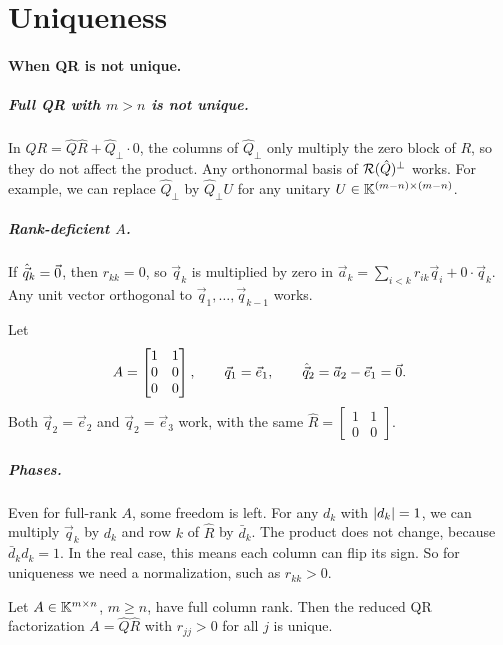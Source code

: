 \section{Uniqueness}

\paragraph{When QR is not unique.}
\subparagraph{Full QR with $m > n$ is not unique.} In $QR = \hat{Q}\hat{R} + \hat{Q}_\perp \cdot 0$, the columns of $\hat{Q}_\perp$ only multiply the zero block of $R$, so they do not affect the product. Any orthonormal basis of $\mathcal{R}(\hat{Q})^\perp$ works. For example, we can replace $\hat{Q}_\perp$ by $\hat{Q}_\perp U$ for any unitary $U \in \mathbb{K}^{(m-n) \times (m-n)}$.

\subparagraph{Rank-deficient $A$.} If $\hat{\vec{q}}_k = \vec{0}$, then $r_{kk} = 0$, so $\vec{q}_k$ is multiplied by zero in $\vec{a}_k = \sum_{i<k} r_{ik}\vec{q}_i + 0 \cdot \vec{q}_k$. Any unit vector orthogonal to $\vec{q}_1, \dots, \vec{q}_{k-1}$ works.

\begin{example}
  Let
  \begin{equation}
    A = \begin{bmatrix} 1 & 1 \\ 0 & 0 \\ 0 & 0 \end{bmatrix}, \qquad \vec{q}_1 = \vec{e}_1, \qquad \hat{\vec{q}}_2 = \vec{a}_2 - \vec{e}_1 = \vec{0}.
  \end{equation}
  Both $\vec{q}_2 = \vec{e}_2$ and $\vec{q}_2 = \vec{e}_3$ work, with the same $\hat{R} = \begin{bmatrix} 1 & 1 \\ 0 & 0 \end{bmatrix}$.
\end{example}

\subparagraph{Phases.} Even for full-rank $A$, some freedom is left. For any $d_k$ with $\left\lvert d_k \right\rvert = 1$, we can multiply $\vec{q}_k$ by $d_k$ and row $k$ of $\hat{R}$ by $\bar{d}_k$. The product does not change, because $\bar{d}_kd_k = 1$. In the real case, this means each column can flip its sign. So for uniqueness we need a normalization, such as $r_{kk} > 0$.

\begin{theorem}
  \label{thm:qr-unique}
  Let $A \in \mathbb{K}^{m \times n}$, $m \ge n$, have full column rank. Then the reduced QR factorization $A = \hat{Q}\hat{R}$ with $r_{jj} > 0$ for all $j$ is unique.
\end{theorem}

